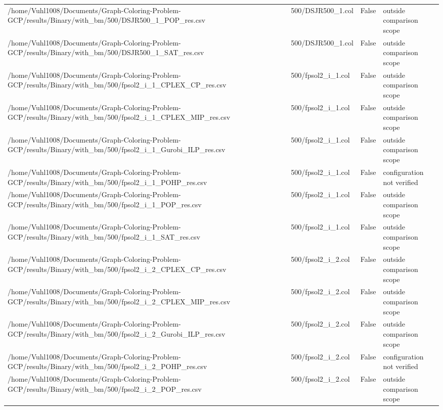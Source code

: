 \begin{table}[htbp]
\begin{tabular}{llll}
/home/Vuhl1008/Documents/Graph-Coloring-Problem-GCP/results/Binary/with\_bm/500/DSJR500\_1\_POP\_res.csv & 500/DSJR500\_1.col & False & outside comparison scope \\
/home/Vuhl1008/Documents/Graph-Coloring-Problem-GCP/results/Binary/with\_bm/500/DSJR500\_1\_SAT\_res.csv & 500/DSJR500\_1.col & False & outside comparison scope \\
/home/Vuhl1008/Documents/Graph-Coloring-Problem-GCP/results/Binary/with\_bm/500/fpsol2\_i\_1\_CPLEX\_CP\_res.csv & 500/fpsol2\_i\_1.col & False & outside comparison scope \\
/home/Vuhl1008/Documents/Graph-Coloring-Problem-GCP/results/Binary/with\_bm/500/fpsol2\_i\_1\_CPLEX\_MIP\_res.csv & 500/fpsol2\_i\_1.col & False & outside comparison scope \\
/home/Vuhl1008/Documents/Graph-Coloring-Problem-GCP/results/Binary/with\_bm/500/fpsol2\_i\_1\_Gurobi\_ILP\_res.csv & 500/fpsol2\_i\_1.col & False & outside comparison scope \\
/home/Vuhl1008/Documents/Graph-Coloring-Problem-GCP/results/Binary/with\_bm/500/fpsol2\_i\_1\_POHP\_res.csv & 500/fpsol2\_i\_1.col & False & configuration not verified \\
/home/Vuhl1008/Documents/Graph-Coloring-Problem-GCP/results/Binary/with\_bm/500/fpsol2\_i\_1\_POP\_res.csv & 500/fpsol2\_i\_1.col & False & outside comparison scope \\
/home/Vuhl1008/Documents/Graph-Coloring-Problem-GCP/results/Binary/with\_bm/500/fpsol2\_i\_1\_SAT\_res.csv & 500/fpsol2\_i\_1.col & False & outside comparison scope \\
/home/Vuhl1008/Documents/Graph-Coloring-Problem-GCP/results/Binary/with\_bm/500/fpsol2\_i\_2\_CPLEX\_CP\_res.csv & 500/fpsol2\_i\_2.col & False & outside comparison scope \\
/home/Vuhl1008/Documents/Graph-Coloring-Problem-GCP/results/Binary/with\_bm/500/fpsol2\_i\_2\_CPLEX\_MIP\_res.csv & 500/fpsol2\_i\_2.col & False & outside comparison scope \\
/home/Vuhl1008/Documents/Graph-Coloring-Problem-GCP/results/Binary/with\_bm/500/fpsol2\_i\_2\_Gurobi\_ILP\_res.csv & 500/fpsol2\_i\_2.col & False & outside comparison scope \\
/home/Vuhl1008/Documents/Graph-Coloring-Problem-GCP/results/Binary/with\_bm/500/fpsol2\_i\_2\_POHP\_res.csv & 500/fpsol2\_i\_2.col & False & configuration not verified \\
/home/Vuhl1008/Documents/Graph-Coloring-Problem-GCP/results/Binary/with\_bm/500/fpsol2\_i\_2\_POP\_res.csv & 500/fpsol2\_i\_2.col & False & outside comparison scope \\

\end{tabular}
\end{table}
